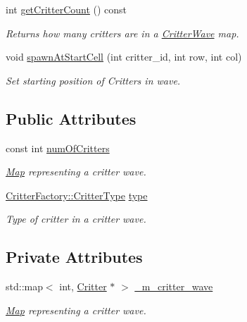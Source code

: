 \begin{DoxyCompactItemize}
int \hyperlink{class_critter_wave_a3c782475b9f1a73ddb658449592b8a33}{get\+Critter\+Count} () const 
\begin{DoxyCompactList}\small\item\em Returns how many critters are in a \hyperlink{class_critter_wave}{Critter\+Wave} map. \end{DoxyCompactList}\item 
void \hyperlink{class_critter_wave_a022f1d4bf44e35401a99e70ccd31dd87}{spawn\+At\+Start\+Cell} (int critter\+\_\+id, int row, int col)
\begin{DoxyCompactList}\small\item\em Set starting position of Critters in wave. \end{DoxyCompactList}\end{DoxyCompactItemize}
\subsection*{Public Attributes}
\begin{DoxyCompactItemize}
\item 
const int \hyperlink{class_critter_wave_a6c8edb08492ed068c5e4c5323695c29d}{num\+Of\+Critters}
\begin{DoxyCompactList}\small\item\em \hyperlink{class_map}{Map} representing a critter wave. \end{DoxyCompactList}\item 
\hyperlink{class_critter_factory_a865a154e14b99d3dbf4d329a49210f6a}{Critter\+Factory\+::\+Critter\+Type} \hyperlink{class_critter_wave_a15d8e4b3eb954f0dfa4f6224d90e0ae0}{type}
\begin{DoxyCompactList}\small\item\em Type of critter in a critter wave. \end{DoxyCompactList}\end{DoxyCompactItemize}
\subsection*{Private Attributes}
\begin{DoxyCompactItemize}
\item 
std\+::map$<$ int, \hyperlink{class_critter}{Critter} $\ast$ $>$ \hyperlink{class_critter_wave_a82475869f718062181e545afb8277217}{\+\_\+m\+\_\+critter\+\_\+wave}
\begin{DoxyCompactList}\small\item\em \hyperlink{class_map}{Map} representing a critter wave. \end{DoxyCompactList}\end{DoxyCompactItemize}

